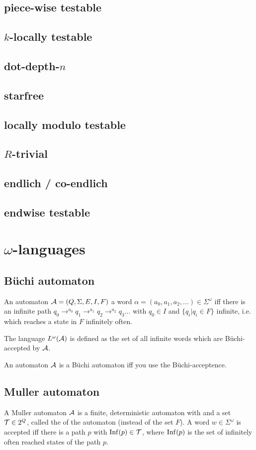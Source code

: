 \subsection{piece-wise testable}
\subsection{$k$-locally testable}
\subsection{dot-depth-$n$}
\subsection{starfree}
\subsection{locally modulo testable}
\subsection{$R$-trivial}
\subsection{endlich / co-endlich}
\subsection{endwise testable}

\section{$\omega$-languages}
\subsection{Büchi automaton}
An automaton $\mathcal{A} = (Q, \Sigma, E, I, F)$  a word $\alpha = (a_0,a_1,a_2,...) \in \Sigma^\omega$ iff there is an infinite path $q_0 \rightarrow^{a_0} q_1 \rightarrow^{a_1} q_2 \rightarrow^{a_2} q_3 ...$ with $q_0 \in I$ and $\{ q_i | q_i \in F \}$ infinite, i.e. which reaches a state in $F$ infinitely often.

The language $L^\omega(\mathcal{A})$ is defined as the set of all infinite words which are Büchi-accepted by  $\mathcal{A}$.

An automaton $\mathcal{A}$ is a Büchi automaton iff you use the Büchi-acceptence.

\subsection{Muller automaton}
A Muller automaton $\mathcal{A}$ is a finite, deterministic automaton with  and a set $\mathcal{T} \in 2^Q$, called the  of the automaton (instead of the set $F$). A word $w \in \Sigma^\omega$ is accepted iff there is a path $p$ with $\operatorname{Inf}(p) \in \mathcal{T}$, where $\operatorname{Inf}(p)$ is the set of infinitely often reached states of the path $p$.

